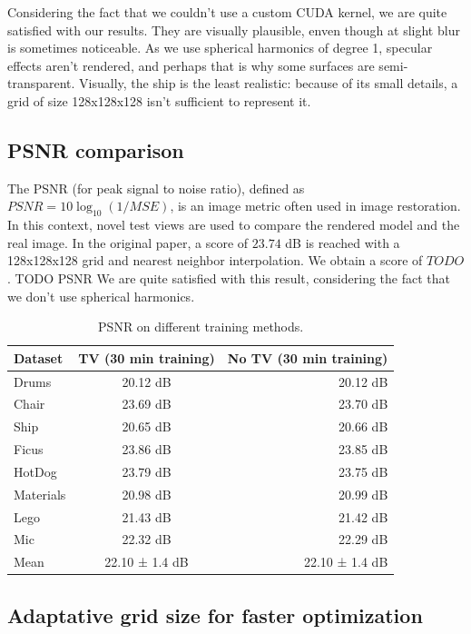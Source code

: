 \documentclass{article}
\begin{document}
Considering the fact that we couldn't use a custom CUDA kernel, we are quite satisfied with our results. They are visually plausible, enven though at slight blur is sometimes noticeable. As we use spherical harmonics of degree 1, specular effects aren't rendered, and perhaps that is why some surfaces are semi-transparent. Visually, the ship is the least realistic: because of its small details, a grid of size 128x128x128 isn't sufficient to represent it.

\subsection{PSNR comparison}

The PSNR (for peak signal to noise ratio), defined as $PSNR = 10\log_{10}(1/MSE)$, is an image metric often used in image restoration. In this context, novel test views are used to compare the rendered model and the real image. In the original paper, a score of $23.74$ dB is reached with a 128x128x128 grid and nearest neighbor interpolation. We obtain a score of $TODO$. TODO PSNR We are quite satisfied with this result, considering the fact that we don't use spherical harmonics. 

\begin{table}[!h]
\centering
\begin{tabular}{|l||c|r|}
\hline
Dataset & TV (30 min training) & No TV (30 min training) \\\hline
Drums & 20.12 dB & 20.12 dB \\
Chair & 23.69 dB & 23.70 dB \\ 
Ship & 20.65  dB & 20.66 dB\\
Ficus & 23.86 dB & 23.85 dB\\
HotDog &  23.79 dB &  23.75 dB  \\
Materials &  20.98 dB &  20.99 dB \\
Lego &   21.43 dB &  21.42 dB  \\
Mic &  22.32 dB & 22.29 dB \\

\hline \hline
Mean & 22.10 ± 1.4  dB & 22.10 ± 1.4 dB \\
\hline 
\end{tabular}
\caption{\label{tab:psnr}PSNR on different training methods.}
\end{table}

\subsection{Adaptative grid size for faster optimization}
\end{document}
